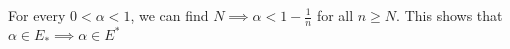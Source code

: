 \documentclass[preview]{standalone}
\begin{document}
\begin{center}
For every $0 < \alpha < 1$, we can find $N \implies \alpha < 1 - \frac{1}{n}$ for all $n \geq N$. This shows that $\alpha \in E_* \implies \alpha \in E^*$
\end{center}
\end{document}
